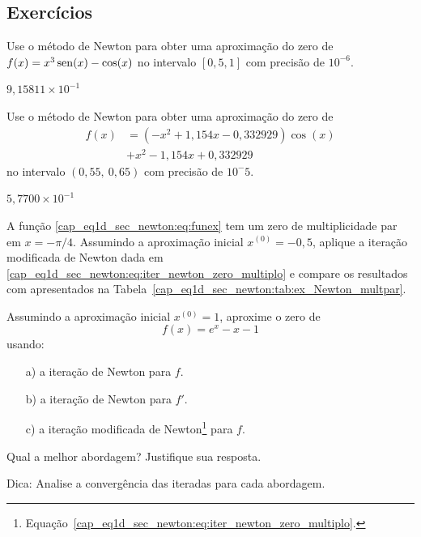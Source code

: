 \subsection*{Exercícios}

\begin{exer}\label{exer:Newton_1}
  Use o método de Newton para obter uma aproximação do zero de $f(x)=x^3\operatorname{sen}(x)-\cos(x)$ no intervalo $[0,5, 1]$ com precisão de $10^{-6}$.
\end{exer}
\begin{resp}
  $9,15811\times 10^{-1}$
\end{resp}

\begin{exer}\label{exer:Newton_multpar}
  Use o método de Newton para obter uma aproximação do zero de
  \begin{align}
    f(x) &= (-x^2+1,154x-0,332929)\cos(x) \nonumber\\
         &+ x^2 - 1,154x + 0,332929
  \end{align}
no intervalo $(0,55, ~0,65)$ com precisão de $10^-5$.
\end{exer}
\begin{resp}
  $5,7700\times 10^{-1}$
\end{resp}

\begin{exer}\label{cap_eq1d_sec_newton:exer:iter_newton_zeros_multiplos}
  A função \eqref{cap_eq1d_sec_newton:eq:funex} tem um zero de multiplicidade par em $x=-\pi/4$. Assumindo a aproximação inicial $x^{(0)} = -0,5$, aplique a iteração modificada de Newton dada em \eqref{cap_eq1d_sec_newton:eq:iter_newton_zero_multiplo} e compare os resultados com apresentados na Tabela~\ref{cap_eq1d_sec_newton:tab:ex_Newton_multpar}.
\end{exer}

\begin{exer}
  Assumindo a aproximação inicial $x^{(0)} = 1$, aproxime o zero de
  \begin{equation}
    f(x) = e^x - x - 1
  \end{equation}
  usando:
  \begin{enumerate}[a)]
  \item[a)] a iteração de Newton para $f$.
  \item[b)] a iteração de Newton para $f'$.
  \item[c)] a iteração modificada de Newton\footnote{Equação~\eqref{cap_eq1d_sec_newton:eq:iter_newton_zero_multiplo}.} para $f$.
  \end{enumerate}
  Qual a melhor abordagem? Justifique sua resposta.
\end{exer}
\begin{resp}
  Dica: Analise a convergência das iteradas para cada abordagem.
\end{resp}

